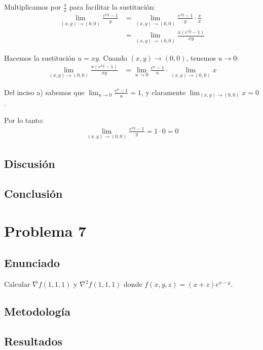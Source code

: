 \documentclass{article}
\begin{document}
Multiplicamos por $\frac{x}{x}$ para facilitar la sustitución:
\begin{align}
\lim_{(x,y) \to (0,0)} \frac{e^{xy} - 1}{y} &= \lim_{(x,y) \to (0,0)} \frac{e^{xy} - 1}{y} \cdot \frac{x}{x} \\
&= \lim_{(x,y) \to (0,0)} \frac{x(e^{xy} - 1)}{xy}
\end{align}

Hacemos la sustitución $u = xy$. Cuando $(x,y) \to (0,0)$, tenemos $u \to 0$:
\begin{align}
\lim_{(x,y) \to (0,0)} \frac{x(e^{xy} - 1)}{xy} &= \lim_{u \to 0} \frac{e^u - 1}{u} \cdot \lim_{(x,y) \to (0,0)} x
\end{align}

Del inciso a) sabemos que $\lim_{u \to 0} \frac{e^u - 1}{u} = 1$, y claramente $\lim_{(x,y) \to (0,0)} x = 0$.

Por lo tanto:
\begin{align}
\lim_{(x,y) \to (0,0)} \frac{e^{xy} - 1}{y} = 1 \cdot 0 = 0
\end{align}

\subsection{Discusión}

\subsection{Conclusión}

\section{Problema 7}

\subsection{Enunciado}
Calcular $\nabla f(1, 1, 1)$ y $\nabla^2 f(1, 1, 1)$ donde $f(x, y, z) = (x + z)e^{x-y}$.

\subsection{Metodología}

\subsection{Resultados}
\setcounter{equation}{0}
\end{document}
